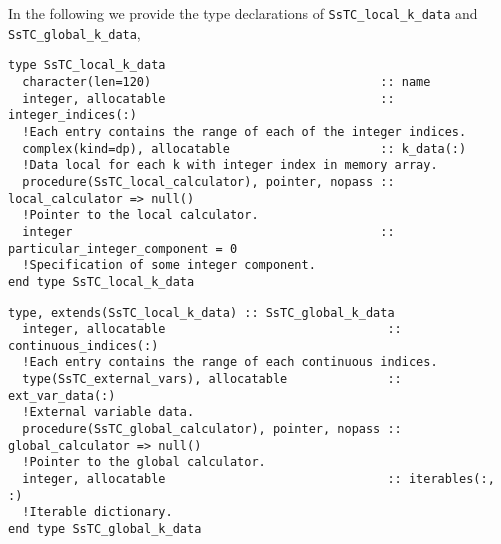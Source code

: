 \documentclass[10pt,a4paper]{article}
\begin{document}
In the following we provide the type declarations of \verb|SsTC_local_k_data| and \verb|SsTC_global_k_data|,
\begin{lstlisting}[caption={Derived type corresponding to ``local k data".},captionpos=b]
type SsTC_local_k_data
  character(len=120)                                :: name
  integer, allocatable                              :: integer_indices(:)
  !Each entry contains the range of each of the integer indices.
  complex(kind=dp), allocatable                     :: k_data(:)
  !Data local for each k with integer index in memory array.
  procedure(SsTC_local_calculator), pointer, nopass :: local_calculator => null()
  !Pointer to the local calculator.
  integer                                           :: particular_integer_component = 0 
  !Specification of some integer component.
end type SsTC_local_k_data
\end{lstlisting}
\begin{lstlisting}[caption={Derived type corresponding to ``global k data".},captionpos=b]
type, extends(SsTC_local_k_data) :: SsTC_global_k_data
  integer, allocatable                               :: continuous_indices(:)
  !Each entry contains the range of each continuous indices.
  type(SsTC_external_vars), allocatable              :: ext_var_data(:)
  !External variable data.
  procedure(SsTC_global_calculator), pointer, nopass :: global_calculator => null()
  !Pointer to the global calculator.
  integer, allocatable                               :: iterables(:, :)
  !Iterable dictionary.
end type SsTC_global_k_data
\end{lstlisting}
\end{document}
